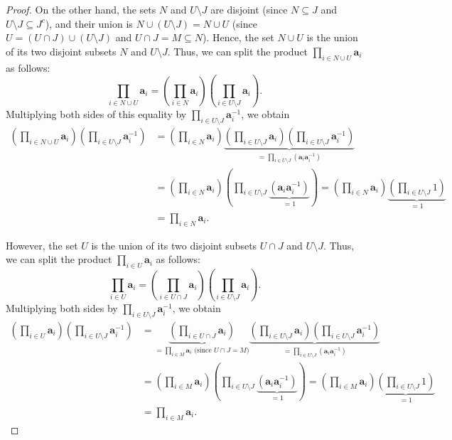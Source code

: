 \begin{proof}
On the other hand, the sets $N$ and $U \setminus J$ are disjoint
(since $N \subseteq J$ and $U \setminus J \subseteq J^c$), and their
union is $N \cup (U \setminus J) = N \cup U$
(since $U = (U \cap J) \cup (U \setminus J)$ and
$U \cap J = M \subseteq N$). Hence, the set $N \cup U$ is the union of
its two disjoint subsets $N$ and $U \setminus J$. Thus, we can split the
product $\prod_{i \in N \cup U} \mathbf{a}_{i}$ as follows:
\[
\prod_{i \in N \cup U} \mathbf{a}_{i}
= \left(\prod_{i \in N} \mathbf{a}_{i}\right)
  \left(\prod_{i \in U \setminus J} \mathbf{a}_{i}\right).
\]
Multiplying both sides of this equality by
$\prod_{i \in U \setminus J} \mathbf{a}_{i}^{-1}$, we obtain
\begin{align*}
\left(\prod_{i \in N \cup U} \mathbf{a}_{i}\right)
\left(\prod_{i \in U \setminus J} \mathbf{a}_{i}^{-1}\right)
&= \left(\prod_{i \in N} \mathbf{a}_{i}\right)
   \underbrace{
     \left(\prod_{i \in U \setminus J} \mathbf{a}_{i}\right)
     \left(\prod_{i \in U \setminus J} \mathbf{a}_{i}^{-1}\right)
   }_{= \prod_{i \in U \setminus J}
     \left(\mathbf{a}_{i} \mathbf{a}_{i}^{-1}\right)} \\
&= \left(\prod_{i \in N} \mathbf{a}_{i}\right)
   \left(\prod_{i \in U \setminus J}
     \underbrace{\left(\mathbf{a}_{i} \mathbf{a}_{i}^{-1}\right)}_{= 1}\right)
 = \left(\prod_{i \in N} \mathbf{a}_{i}\right)
   \underbrace{\left(\prod_{i \in U \setminus J} 1\right)}_{= 1} \\
&= \prod_{i \in N} \mathbf{a}_{i}.
\end{align*}

However, the set $U$ is the union of its two disjoint subsets $U \cap J$
and $U \setminus J$. Thus, we can split the product
$\prod_{i \in U} \mathbf{a}_{i}$ as follows:
\[
\prod_{i \in U} \mathbf{a}_{i}
= \left(\prod_{i \in U \cap J} \mathbf{a}_{i}\right)
  \left(\prod_{i \in U \setminus J} \mathbf{a}_{i}\right).
\]
Multiplying both sides by
$\prod_{i \in U \setminus J} \mathbf{a}_{i}^{-1}$, we obtain
\begin{align*}
\left(\prod_{i \in U} \mathbf{a}_{i}\right)
\left(\prod_{i \in U \setminus J} \mathbf{a}_{i}^{-1}\right)
&= \underbrace{\left(\prod_{i \in U \cap J} \mathbf{a}_{i}\right)}_{
     = \prod_{i \in M} \mathbf{a}_{i}
     \text{ (since } U \cap J = M \text{)}}
   \underbrace{
     \left(\prod_{i \in U \setminus J} \mathbf{a}_{i}\right)
     \left(\prod_{i \in U \setminus J} \mathbf{a}_{i}^{-1}\right)
   }_{= \prod_{i \in U \setminus J}
     \left(\mathbf{a}_{i} \mathbf{a}_{i}^{-1}\right)} \\
&= \left(\prod_{i \in M} \mathbf{a}_{i}\right)
   \left(\prod_{i \in U \setminus J}
     \underbrace{\left(\mathbf{a}_{i} \mathbf{a}_{i}^{-1}\right)}_{= 1}\right)
 = \left(\prod_{i \in M} \mathbf{a}_{i}\right)
   \underbrace{\left(\prod_{i \in U \setminus J} 1\right)}_{= 1} \\
&= \prod_{i \in M} \mathbf{a}_{i}.
\end{align*}


\end{proof}
